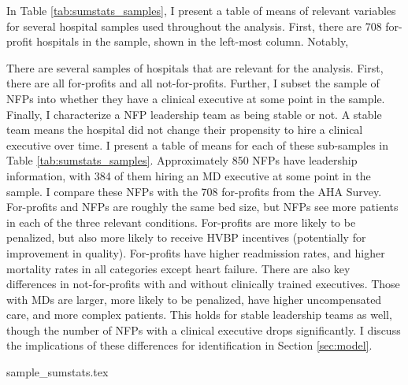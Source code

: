 \documentclass[12pt]{article}
\begin{document}


    In Table \ref{tab:sumstats_samples}, I present a table of means of relevant variables for several hospital samples used throughout the analysis. First, there are 708 for-profit hospitals in the sample, shown in the left-most column. Notably,

    There are several samples of hospitals that are relevant for the analysis. First, there are all for-profits and all not-for-profits. Further, I subset the sample of NFPs into whether they have a clinical executive at some point in the sample. Finally, I characterize a NFP leadership team as being stable or not. A stable team means the hospital did not change their propensity to hire a clinical executive over time. I present a table of means for each of these sub-samples in Table \ref{tab:sumstats_samples}. Approximately 850 NFPs have leadership information, with 384 of them hiring an MD executive at some point in the sample. I compare these NFPs with the 708 for-profits from the AHA Survey. For-profits and NFPs are roughly the same bed size, but NFPs see more patients in each of the three relevant conditions. For-profits are more likely to be penalized, but also more likely to receive HVBP incentives (potentially for improvement in quality). For-profits have higher readmission rates, and higher mortality rates in all categories except heart failure. There are also key differences in not-for-profits with and without clinically trained executives. Those with MDs are larger, more likely to be penalized, have higher uncompensated care, and more complex patients. This holds for stable leadership teams as well, though the number of NFPs with a clinical executive drops significantly. I discuss the implications of these differences for identification in Section \ref{sec:model}. 

    {sample_sumstats.tex}
\end{document}
